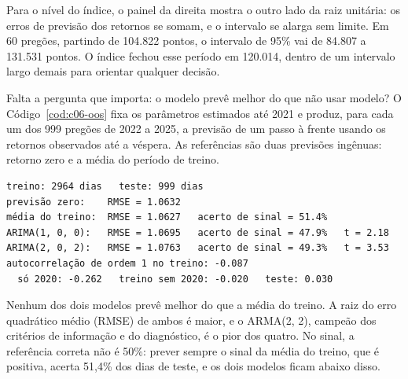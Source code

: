 
Para o nível do índice, o painel da direita mostra o outro lado da raiz unitária: os erros de previsão dos retornos se somam, e o intervalo se alarga sem limite. Em 60 pregões, partindo de 104.822 pontos, o intervalo de 95\% vai de 84.807 a 131.531 pontos. O índice fechou esse período em 120.014, dentro de um intervalo largo demais para orientar qualquer decisão.

Falta a pergunta que importa: o modelo prevê melhor do que não usar modelo? O Código~\ref{cod:c06-oos} fixa os parâmetros estimados até 2021 e produz, para cada um dos 999 pregões de 2022 a 2025, a previsão de um passo à frente usando os retornos observados até a véspera. As referências são duas previsões ingênuas: retorno zero e a média do período de treino.

\Needspace{32mm}

\Needspace{34mm}
\begin{lstlisting}[style=saida]
treino: 2964 dias   teste: 999 dias
previsão zero:    RMSE = 1.0632
média do treino:  RMSE = 1.0627   acerto de sinal = 51.4%
ARIMA(1, 0, 0):   RMSE = 1.0695   acerto de sinal = 47.9%   t = 2.18
ARIMA(2, 0, 2):   RMSE = 1.0763   acerto de sinal = 49.3%   t = 3.53
autocorrelação de ordem 1 no treino: -0.087
  só 2020: -0.262   treino sem 2020: -0.020   teste: 0.030
\end{lstlisting}

Nenhum dos dois modelos prevê melhor do que a média do treino. A raiz do erro quadrático médio (RMSE) de ambos é maior, e o ARMA(2, 2), campeão dos critérios de informação e do diagnóstico, é o pior dos quatro. No sinal, a referência correta não é 50\%: prever sempre o sinal da média do treino, que é positiva, acerta 51,4\% dos dias de teste, e os dois modelos ficam abaixo disso.

